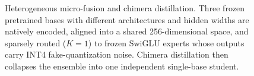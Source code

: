 \documentclass[10pt,twoside]{article}
\theoremstyle{definition}
\begin{document}
\begin{figure}[t]
{}%
\caption{Heterogeneous micro-fusion and chimera distillation. Three frozen pretrained bases with different architectures and hidden widths are natively encoded, aligned into a shared 256-dimensional space, and sparsely routed ($K{=}1$) to frozen SwiGLU experts whose outputs carry INT4 fake-quantization noise. Chimera distillation then collapses the ensemble into one independent single-base student.}
\label{fig:overview}
\end{figure}
\end{document}
